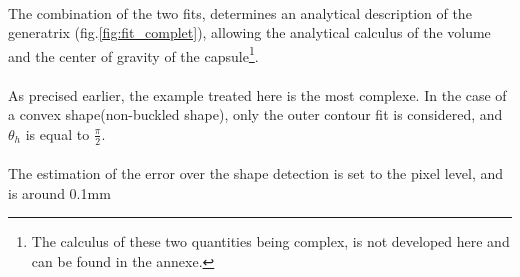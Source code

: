 \paragraph{}
The combination of the two fits, determines an analytical description of the generatrix (fig.\ref{fig:fit_complet}), allowing the analytical calculus of the volume and the center of gravity of the capsule\footnote{The calculus of these two quantities being complex, is not developed here and can be found in the annexe.}. 
\paragraph{}
As precised earlier, the example treated here is the most complexe. In the case of a convex shape(non-buckled shape), only the outer contour fit is considered, and $\theta_h$ is equal to $\frac{\pi}{2}$.
\paragraph{}
The estimation of the error over the shape detection is set to the pixel level, and is around 0.1mm


